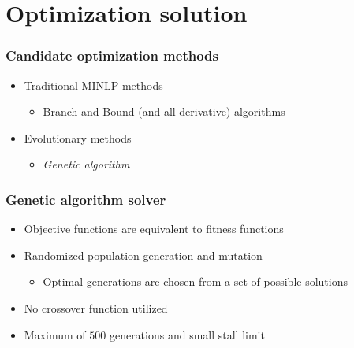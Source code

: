 \documentclass[handout]{beamer}
\begin{document}

\section{Optimization solution}
\begin{frame}
	\frametitle{Candidate optimization methods}
	\begin{itemize}
		\item Traditional MINLP methods
		\begin{itemize}
			\item Branch and Bound (and all derivative) algorithms
		\end{itemize}
		\item Evolutionary methods
		\begin{itemize}
			\item \emph{Genetic algorithm}
		\end{itemize}
	\end{itemize}
\end{frame}

\begin{frame}
	\frametitle{Genetic algorithm solver}
	\begin{itemize}
		\item Objective functions are equivalent to fitness functions
		\item Randomized population generation and mutation
		\begin{itemize}
			\item Optimal generations are chosen from a set of possible solutions
		\end{itemize}
		\item No crossover function utilized
		\item Maximum of $500$ generations and small stall limit
	\end{itemize}
\end{frame}	
\end{document}
